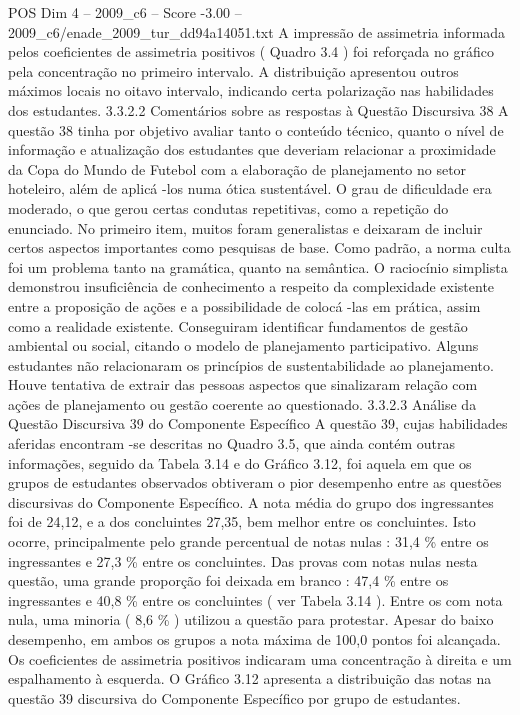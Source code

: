 \begin{textsample}{POS Dim 4 – 2009\_c6 – Score -3.00 – 2009\_c6/enade\_2009\_tur\_dd94a14051.txt}
A impressão de assimetria informada pelos coeficientes de assimetria positivos ( Quadro 3.4 ) foi reforçada no gráfico pela concentração no primeiro intervalo.
A distribuição apresentou outros máximos locais no oitavo intervalo, indicando certa polarização nas habilidades dos estudantes. 3.3.2.2 Comentários sobre as respostas à Questão Discursiva 38 A questão 38 tinha por objetivo avaliar tanto o conteúdo técnico, quanto o nível de informação e atualização dos estudantes que deveriam relacionar a proximidade da Copa do Mundo de Futebol com a elaboração de planejamento no setor hoteleiro, além de aplicá -los numa ótica sustentável.
O grau de dificuldade era moderado, o que gerou certas condutas repetitivas, como a repetição do enunciado.
No primeiro item, muitos foram generalistas e deixaram de incluir certos aspectos importantes como pesquisas de base.
Como padrão, a norma culta foi um problema tanto na gramática, quanto na semântica.
O raciocínio simplista demonstrou insuficiência de conhecimento a respeito da complexidade existente entre a proposição de ações e a possibilidade de colocá -las em prática, assim como a realidade existente.
Conseguiram identificar fundamentos de gestão ambiental ou social, citando o modelo de planejamento participativo.
Alguns estudantes não relacionaram os princípios de sustentabilidade ao planejamento.
Houve tentativa de extrair das pessoas aspectos que sinalizaram relação com ações de planejamento ou gestão coerente ao questionado. 3.3.2.3 Análise da Questão Discursiva 39 do Componente Específico A questão 39, cujas habilidades aferidas encontram -se descritas no Quadro 3.5, que ainda contém outras informações, seguido da Tabela 3.14 e do Gráfico 3.12, foi aquela em que os grupos de estudantes observados obtiveram o pior desempenho entre as questões discursivas do Componente Específico.
A nota média do grupo dos ingressantes foi de 24,12, e a dos concluintes 27,35, bem melhor entre os concluintes.
Isto ocorre, principalmente pelo grande percentual de notas nulas : 31,4 \% entre os ingressantes e 27,3 \% entre os concluintes.
Das provas com notas nulas nesta questão, uma grande proporção foi deixada em branco : 47,4 \% entre os ingressantes e 40,8 \% entre os concluintes ( ver Tabela 3.14 ).
Entre os com nota nula, uma minoria ( 8,6 \% ) utilizou a questão para protestar.
Apesar do baixo desempenho, em ambos os grupos a nota máxima de 100,0 pontos foi alcançada.
Os coeficientes de assimetria positivos indicaram uma concentração à direita e um espalhamento à esquerda.
O Gráfico 3.12 apresenta a distribuição das notas na questão 39 discursiva do Componente Específico por grupo de estudantes.

\end{textsample}
